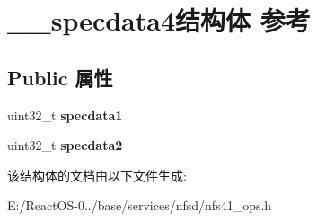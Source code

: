 \hypertarget{struct____specdata4}{}\section{\+\_\+\+\_\+specdata4结构体 参考}
\label{struct____specdata4}
\subsection*{Public 属性}
\begin{DoxyCompactItemize}
\item 
\mbox{\label{struct____specdata4_a0be474142c2ad0918b64ecef8e39cbc2}} 
uint32\+\_\+t {\bfseries specdata1}
\item 
\mbox{\label{struct____specdata4_a34f903e10d2fbca44fa889e0cf8cffc6}} 
uint32\+\_\+t {\bfseries specdata2}
\end{DoxyCompactItemize}


该结构体的文档由以下文件生成\+:\begin{DoxyCompactItemize}
\item 
E\+:/\+React\+O\+S-\/0../base/services/nfsd/nfs41\+\_\+ops.\+h\end{DoxyCompactItemize}
